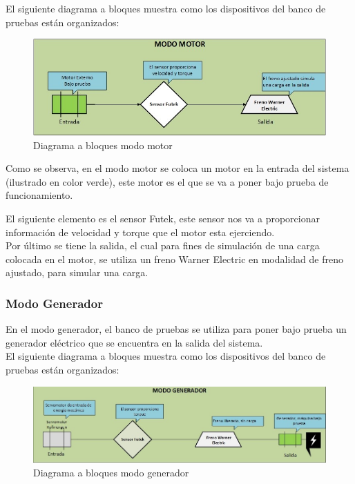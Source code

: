 \documentclass[12pt,titlepage]{article}
\begin{document}
El siguiente diagrama a bloques muestra como los dispositivos del banco de pruebas están organizados: \\ 
\begin{figure}[htbp]
\hspace*{0.2cm} 
\includegraphics[scale=0.90]{MODO_MOTOR}
\caption{Diagrama a bloques modo motor}
\end{figure}

Como se observa, en el modo motor se coloca un motor en la entrada del sistema (ilustrado en color verde),  este motor es el que se va a poner bajo prueba de funcionamiento.

\vspace{5mm}

El siguiente elemento es el sensor Futek, este sensor nos va a proporcionar información de velocidad y torque que el motor esta ejerciendo. \\

Por último se tiene la salida, el cual para fines de simulación de una carga colocada en el motor, se utiliza  un freno Warner Electric en modalidad de freno ajustado, para simular una carga.\\
\newpage
\subsubsection{Modo Generador}
En el modo generador, el banco de pruebas se utiliza para poner bajo prueba un generador eléctrico que se encuentra en la salida del sistema. \\ 

El siguiente diagrama a bloques muestra como los dispositivos del banco de pruebas están organizados: \\ 

\begin{figure}[htbp]
\hspace*{0.45cm} 
\includegraphics[scale=0.70]{Modo_Generador}
\caption{Diagrama a bloques modo generador}
\end{figure}
\end{document}
